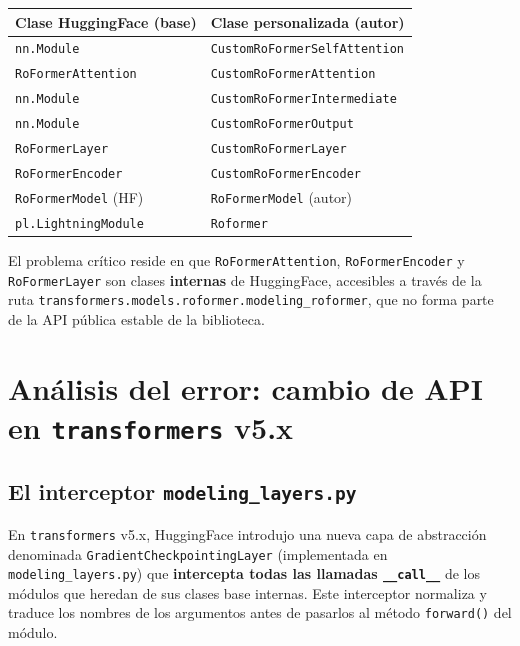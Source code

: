 \documentclass[12pt,a4paper]{article}
\begin{document}
\begin{center}
\begin{tabular}{ll}
\toprule
\textbf{Clase HuggingFace (base)} & \textbf{Clase personalizada (autor)} \\
\midrule
\texttt{nn.Module} & \texttt{CustomRoFormerSelfAttention} \\
\texttt{RoFormerAttention} & \texttt{CustomRoFormerAttention} \\
\texttt{nn.Module} & \texttt{CustomRoFormerIntermediate} \\
\texttt{nn.Module} & \texttt{CustomRoFormerOutput} \\
\texttt{RoFormerLayer} & \texttt{CustomRoFormerLayer} \\
\texttt{RoFormerEncoder} & \texttt{CustomRoFormerEncoder} \\
\texttt{RoFormerModel} (HF) & \texttt{RoFormerModel} (autor) \\
\texttt{pl.LightningModule} & \texttt{Roformer} \\
\bottomrule
\end{tabular}
\end{center}

El problema crítico reside en que \texttt{RoFormerAttention}, \texttt{RoFormerEncoder}
y \texttt{RoFormerLayer} son clases \textbf{internas} de HuggingFace, accesibles a través
de la ruta \texttt{transformers.models.roformer.modeling\_roformer}, que no forma parte
de la API pública estable de la biblioteca.

\section{Análisis del error: cambio de API en \texttt{transformers} v5.x}

\subsection{El interceptor \texttt{modeling\_layers.py}}

En \texttt{transformers} v5.x, HuggingFace introdujo una nueva capa de abstracción
denominada \texttt{GradientCheckpointingLayer} (implementada en \texttt{modeling\_layers.py})
que \textbf{intercepta todas las llamadas \texttt{\_\_call\_\_}} de los módulos que heredan
de sus clases base internas. Este interceptor normaliza y traduce los nombres de los
argumentos antes de pasarlos al método \texttt{forward()} del módulo.
\end{document}
